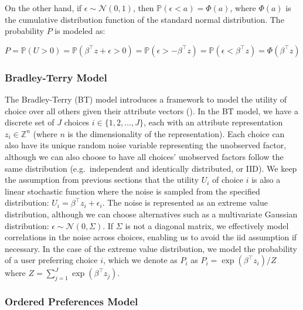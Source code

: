 \documentclass[
  letterpaper,
  numbers=noenddot,
  DIV=11]{scrreprt}
\theoremstyle{definition}
\theoremstyle{plain}
\theoremstyle{plain}
\theoremstyle{remark}
\begin{document}
On the other hand, if \(\epsilon \sim \mathcal{N}(0, 1)\), then
\(\mathbb{P}(\epsilon < a) = \Phi(a)\), where \(\Phi(a)\) is the
cumulative distribution function of the standard normal distribution.
The probability \(P\) is modeled as:

\[P = \mathbb{P}(U > 0) = \mathbb{P}(\beta^\top z + \epsilon > 0) = \mathbb{P}( \epsilon > -\beta^\top z) = \mathbb{P}( \epsilon < \beta^\top z) = \Phi(\beta^\top z)\]

\subsubsection*{Bradley-Terry Model}\label{bradley-terry-model}

The Bradley-Terry (BT) model introduces a framework to model the utility
of choice over all others given their attribute vectors
(). In the BT
model, we have a discrete set of \(J\) choices
\(i \in \{1, 2, \dots, J\}\), each with an attribute representation
\(z_i \in \mathbb{Z}^n\) (where \(n\) is the dimensionality of the
representation). Each choice can also have its unique random noise
variable representing the unobserved factor, although we can also choose
to have all choices' unobserved factors follow the same distribution
(e.g.~independent and identically distributed, or IID). We keep the
assumption from previous sections that the utility \(U_i\) of choice
\(i\) is also a linear stochastic function where the noise is sampled
from the specified distribution: \(U_i = \beta^\top z_i + \epsilon_i\).
The noise is represented as an extreme value distribution, although we
can choose alternatives such as a multivariate Gaussian distribution:
\(\epsilon \sim \mathcal{N}(0, \Sigma)\). If \(\Sigma\) is not a
diagonal matrix, we effectively model correlations in the noise across
choices, enabling us to avoid the iid assumption if necessary. In the
case of the extreme value distribution, we model the probability of a
user preferring choice \(i\), which we denote as \(P_i\) as
\(P_i = \exp(\beta^\top z_i)/Z\) where
\(Z = \sum_{j = 1}^{J} \exp(\beta^\top z_j)\).

\subsubsection*{Ordered Preferences
Model}\label{ordered-preferences-model}
\end{document}
